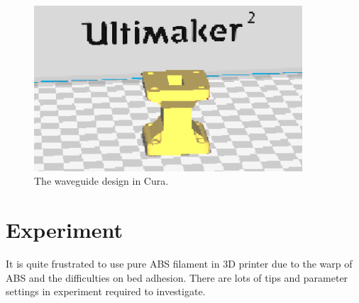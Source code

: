 \begin{figure}[htbp]
  \centering
  \includegraphics[width=10cm]{Figs//waveguide_design.PNG}
  \caption[The cube design in Cura]{\footnotesize The waveguide design in Cura.}
  \label{Fig:waveguide}
\end{figure}

\section{Experiment}
It is quite frustrated to use pure ABS filament in 3D printer due to the warp of ABS and the difficulties on bed adhesion. There are lots of tips and parameter settings in experiment required to investigate.

